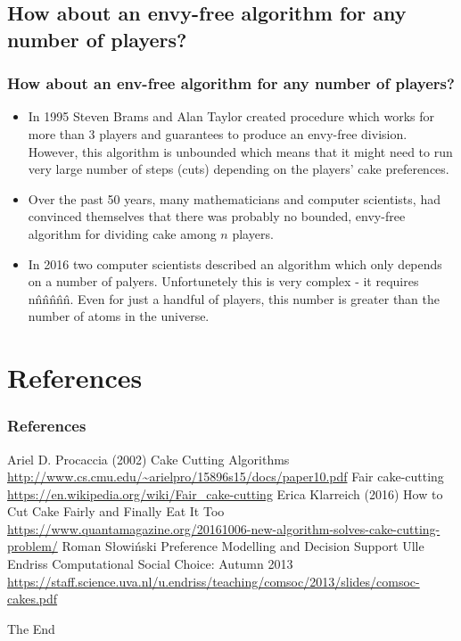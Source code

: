 \documentclass{beamer}
\begin{document}
\subsection{How about an envy-free algorithm for any number of players?}
\begin{frame}
\frametitle{How about an env-free algorithm for any number of players?}
\begin{itemize}
\item In 1995 Steven Brams and Alan Taylor created procedure which works for more than 3 players and guarantees to produce an envy-free division. However, this algorithm is unbounded which means that it might need to run very large number of steps (cuts) depending on the players' cake preferences.
\item Over the past 50 years, many mathematicians and computer scientists, had convinced themselves that there was probably no bounded, envy-free algorithm for dividing cake among $n$ players.
\item In 2016 two computer scientists described an algorithm which only depends on a number of palyers. Unfortunetely this is very complex - it requires n\^n\^n\^n\^n\^n. Even for just a handful of players, this number is greater than the number of atoms in the universe.
\end{itemize}
\end{frame}


\section{References}
\begin{frame}
\frametitle{References}
\footnotesize{
\begin{thebibliography}{99} %
 Ariel D. Procaccia (2002)
\newblock Cake Cutting Algorithms
\newblock \url{http://www.cs.cmu.edu/~arielpro/15896s15/docs/paper10.pdf}
 Fair cake-cutting
\newblock \url{https://en.wikipedia.org/wiki/Fair\_cake-cutting}
 Erica Klarreich (2016)
\newblock How to Cut Cake Fairly and Finally Eat It Too
\newblock \url{https://www.quantamagazine.org/20161006-new-algorithm-solves-cake-cutting-problem/}
 Roman Słowiński
\newblock Preference Modelling and Decision Support
 Ulle Endriss 
\newblock Computational Social Choice: Autumn 2013
\newblock \url{https://staff.science.uva.nl/u.endriss/teaching/comsoc/2013/slides/comsoc-cakes.pdf}

\end{thebibliography}
}
\end{frame}


\begin{frame}
\Huge{\centerline{The End}}
\end{frame}

\end{document}
